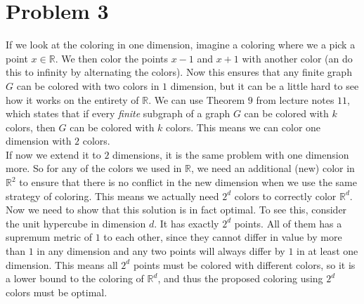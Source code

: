 \documentclass[a4paper]{article}
\begin{document}
\section{Problem 3}
If we look at the coloring in one dimension, imagine a coloring where we a pick a point $x\in \mathbb{R}$. We then color the points $x-1$ and $x+1$ with another color (an do this to infinity by alternating the colors). Now this ensures that any finite graph $G$ can be colored with two colors in $1$ dimension, but it can be a little hard to see how it works on the entirety of $\mathbb{R}$. We can use Theorem $9$ from lecture notes $11$, which states that if every \textit{finite} subgraph of a graph $G$ can be colored with $k$ colors, then $G$ can be colored with $k$ colors. This means we can color one dimension with $2$ colors. \\
If now we extend it to $2$ dimensions, it is the same problem with one dimension more. So for any of the colors we used in $\mathbb{R}$, we need an additional (new) color in $\mathbb{R}^2$ to ensure that there is no conflict in the new dimension when we use the same strategy of coloring. This means we actually need $2^d$ colors to correctly color $\mathbb{R}^d$. \\
Now we need to show that this solution is in fact optimal. To see this, consider the unit hypercube in dimension $d$. It has exactly $2^d$ points. All of them has a supremum metric of $1$ to each other, since they cannot differ in value by more than $1$ in any dimension and any two points will always differ by $1$ in at least one dimension. This means all $2^d$ points must be colored with different colors, so it is a lower bound to the coloring of $\mathbb{R}^d$, and thus the proposed coloring using $2^d$ colors must be optimal.
\end{document}
